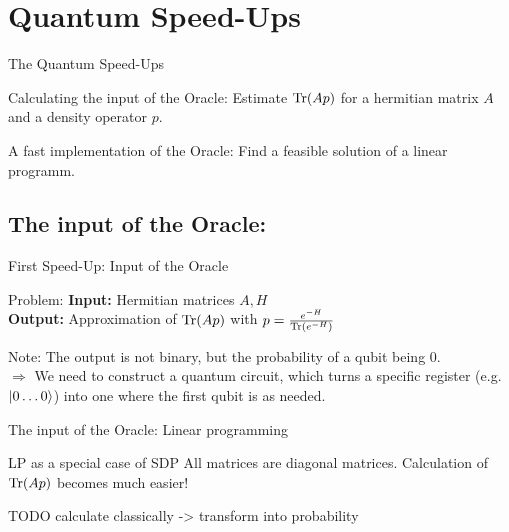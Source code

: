 \section{Quantum Speed-Ups}


\begin{frame}{The Quantum Speed-Ups}
 \begin{block}{Calculating the input of the Oracle:}
  Estimate $\operatorname{Tr}(Ap)$ for a hermitian matrix $A$ and a density operator $p$.
 \end{block}
 
 \begin{block}{A fast implementation of the Oracle:}
  Find a feasible solution of a linear programm.
 \end{block}
\end{frame}

\subsection{The input of the Oracle:}

\begin{frame}{First Speed-Up: Input of the Oracle}
 \begin{block}{Problem:}
  \textbf{Input:} Hermitian matrices $A,H$ \\
  \textbf{Output:} Approximation of $\operatorname{Tr}(Ap)$ with $p=\frac{e^{-H}}{\operatorname{Tr}(e^{-H})}$
 \end{block}
 
 \begin{block}{Note:}
  The output is not binary, but the probability of a qubit being $0$.\\
  \alert{$\Rightarrow$ We need to construct a quantum circuit, which turns a specific register (e.g. $\ket{0\ldots 0}$) into one where the first qubit is as needed.}
 \end{block} 
\end{frame}

\begin{frame}{The input of the Oracle: Linear programming}
\begin{block}{LP as a special case of SDP}
All matrices are diagonal matrices.
\alert{Calculation of $\operatorname{Tr}(Ap)$ becomes much easier!}
\end{block}

TODO calculate classically -> transform into probability

\end{frame}

